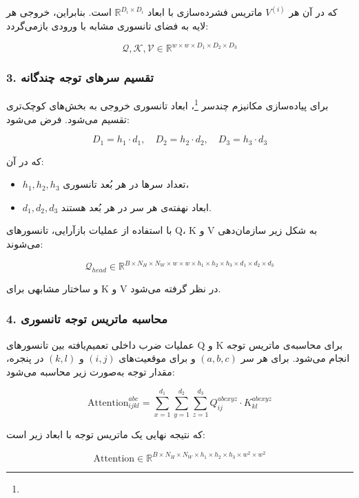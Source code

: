 که در آن هر $V^{(i)}$ ماتریس فشرده‌سازی با ابعاد $\mathbb{R}^{D_i \times D_i}$ است. بنابراین، خروجی هر لایه به فضای تانسوری مشابه با ورودی بازمی‌گردد:

\[
\mathcal{Q}, \mathcal{K}, \mathcal{V} \in \mathbb{R}^{w \times w \times D_1 \times D_2 \times D_3}
\]

\subsubsection*{3. تقسیم سرهای توجه چندگانه}

برای پیاده‌سازی مکانیزم چندسر \footnote{}، ابعاد تانسوری خروجی به بخش‌های کوچک‌تری تقسیم می‌شود. فرض می‌شود:

\[
D_1 = h_1 \cdot d_1, \quad D_2 = h_2 \cdot d_2, \quad D_3 = h_3 \cdot d_3
\]

که در آن:
\begin{itemize}
	\item $h_1, h_2, h_3$ تعداد سرها در هر بُعد تانسوری،
	\item $d_1, d_2, d_3$ ابعاد نهفته‌ی هر سر در هر بُعد هستند.
\end{itemize}

با استفاده از عملیات بازآرایی، تانسورهای Q، K و V به شکل زیر سازمان‌دهی می‌شوند:

\[
\mathcal{Q}_{head} \in \mathbb{R}^{B \times N_H \times N_W \times w \times w \times h_1 \times h_2 \times h_3 \times d_1 \times d_2 \times d_3}
\]

و ساختار مشابهی برای K و V در نظر گرفته می‌شود.

\subsubsection*{4. محاسبه ماتریس توجه تانسوری}

عملیات ضرب داخلی تعمیم‌یافته بین تانسورهای Q و K برای محاسبه‌ی ماتریس توجه انجام می‌شود. برای هر سر $(a,b,c)$ و برای موقعیت‌های $(i,j)$ و $(k,l)$ در پنجره، مقدار توجه به‌صورت زیر محاسبه می‌شود:

\begin{equation}
	\text{Attention}_{ijkl}^{abc} = \sum_{x=1}^{d_1} \sum_{y=1}^{d_2} \sum_{z=1}^{d_3}
	Q_{ij}^{abcxyz} \cdot K_{kl}^{abcxyz}
\end{equation}

که نتیجه نهایی یک ماتریس توجه با ابعاد زیر است:

\[
\text{Attention} \in \mathbb{R}^{B \times N_H \times N_W \times h_1 \times h_2 \times h_3 \times w^2 \times w^2}
\]

